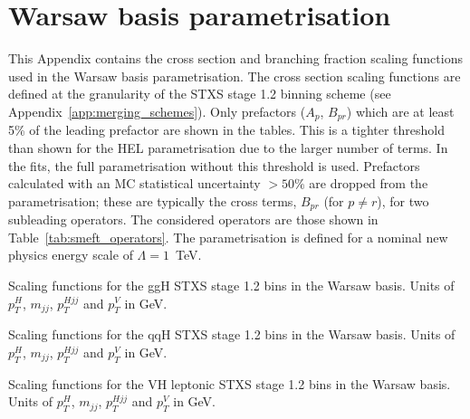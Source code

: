 \chapter{Warsaw basis parametrisation}\label{app:smeft_parametrisation}

This Appendix contains the cross section and branching fraction scaling functions used in the Warsaw basis parametrisation. The cross section scaling functions are defined at the granularity of the STXS stage 1.2 binning scheme (see Appendix~\ref{app:merging_schemes}). Only prefactors ($A_p$, $B_{pr}$) which are at least 5\% of the leading prefactor are shown in the tables. This is a tighter threshold than shown for the HEL parametrisation due to the larger number of terms. In the fits, the full parametrisation without this threshold is used. Prefactors calculated with an MC statistical uncertainty $>50\%$ are dropped from the parametrisation; these are typically the cross terms, $B_{pr}$ (for $p \neq r$), for two subleading operators. The considered operators are those shown in Table~\ref{tab:smeft_operators}. The parametrisation is defined for a nominal new physics energy scale of $\Lambda = 1$~TeV. 

\begin{table}[htb!]
  \centering
  \tiny
  \renewcommand{\arraystretch}{1.8}
  \setlength{\tabcolsep}{6pt}
  \caption[Warsaw: Scaling functions for the ggH STXS stage 1.2 bins]
  {
    Scaling functions for the ggH STXS stage 1.2 bins in the Warsaw basis. Units of $p_T^H$, $m_{jj}$, $p_T^{Hjj}$ and $p_T^V$ in GeV.
  }
  \label{tab:warsaw_parametrisation_a}
  \hspace*{-2cm}
  
  \hspace*{-2cm}
\end{table}

\begin{table}[htb!]
  \centering
  \tiny
  \renewcommand{\arraystretch}{2.5}
  \setlength{\tabcolsep}{6pt}
  \caption[Warsaw: Scaling functions for the qqH STXS stage 1.2 bins]
  {
    Scaling functions for the qqH STXS stage 1.2 bins in the Warsaw basis. Units of $p_T^H$, $m_{jj}$, $p_T^{Hjj}$ and $p_T^V$ in GeV.
  }
  \label{tab:warsaw_parametrisation_b}
  \hspace*{-2cm}
  
  \hspace*{-2cm}
\end{table}

\begin{table}[htb!]
  \centering
  \tiny
  \renewcommand{\arraystretch}{3}
  \setlength{\tabcolsep}{6pt}
  \caption[Warsaw: Scaling functions for the VH leptonic STXS stage 1.2 bins]
  {
    Scaling functions for the VH leptonic STXS stage 1.2 bins in the Warsaw basis. Units of $p_T^H$, $m_{jj}$, $p_T^{Hjj}$ and $p_T^V$ in GeV.
  }
  \label{tab:warsaw_parametrisation_c}
  \hspace*{-2cm}
  
  \hspace*{-2cm}
\end{table}

